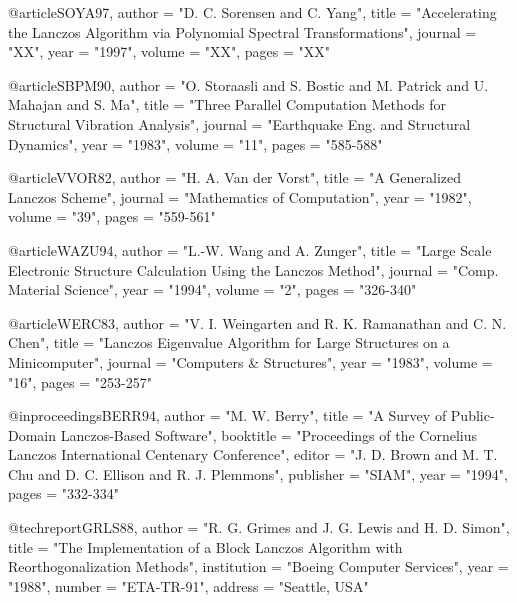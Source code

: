 @article{SOYA97,
   author       = "D. C. Sorensen and C. Yang",
   title        = "{Accelerating the Lanczos Algorithm via
                   Polynomial Spectral Transformations}",
   journal      = "XX",
   year         = "1997",
   volume       = "XX",
   pages        = "XX"}

@article{SBPM90,
   author       = "O. Storaasli and S. Bostic and M. Patrick 
                   and U. Mahajan and S. Ma",
   title        = "{Three Parallel Computation Methods for
                   Structural Vibration Analysis}",
   journal      = "Earthquake Eng. and Structural Dynamics",
   year         = "1983",
   volume       = "11",
   pages        = "585-588"}

@article{VVOR82,  
   author       = "H. A. Van der Vorst",
   title        = "{A Generalized Lanczos Scheme}",
   journal      = "Mathematics of Computation",    
   year         = "1982",
   volume       = "39",
   pages        = "559-561"}

@article{WAZU94,  
   author       = "L.-W. Wang and A. Zunger",
   title        = "{Large Scale Electronic Structure Calculation
                   Using the Lanczos Method}",
   journal      = "Comp. Material Science",    
   year         = "1994",
   volume       = "2",
   pages        = "326-340"}

@article{WERC83,  
   author       = "V. I. Weingarten and R. K. Ramanathan and
                   C. N. Chen",
   title        = "{Lanczos Eigenvalue Algorithm for Large
                   Structures on a Minicomputer}",
   journal      = "Computers \& Structures",    
   year         = "1983",
   volume       = "16",
   pages        = "253-257"}


@inproceedings{BERR94,
   author       = "M. W. Berry",
   title        = "{A Survey of Public-Domain Lanczos-Based Software}",
   booktitle    = "Proceedings of the Cornelius Lanczos
                   International Centenary Conference",
   editor       = "J. D. Brown and M. T. Chu and D. C. Ellison
                   and R. J. Plemmons",
   publisher    = "SIAM",
   year         = "1994",
   pages        = "332-334"}

@techreport{GRLS88,
   author       = "R. G. Grimes and J. G. Lewis and H. D. Simon",
   title        = "{The Implementation of a Block Lanczos Algorithm
                   with Reorthogonalization Methods}",
   institution  = "Boeing Computer Services",
   year         = "1988",
   number       = "ETA-TR-91",
   address      = "Seattle, USA"}

